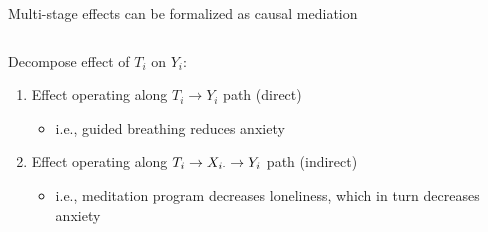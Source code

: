 \documentclass[aspectratio=169]{beamer}
\theoremstyle{remark}
\begin{document}
\begin{frame}{Multi-stage effects can be formalized as causal mediation}
    \begin{columns}
        \begin{column}{0.67 \textwidth}
            Decompose effect of $T_i$ on $Y_i$:

            \vspace{4mm}

            \begin{enumerate}
                \item Effect operating along $T_i \to Y_i$ path (direct)
                      \begin{itemize}
                          \item i.e., guided breathing reduces anxiety
                      \end{itemize}
                      \vspace{2mm}
                \item Effect operating along $T_i \to X_{i \cdot} \to Y_i$ path (indirect)

                      \begin{itemize}
                          \item i.e., meditation program decreases loneliness, which in turn decreases anxiety
                      \end{itemize}
            \end{enumerate}


\end{column}
\end{columns}
\end{frame}
\end{document}
